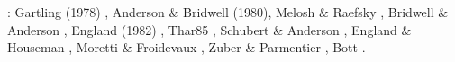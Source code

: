 \Literature: 
Gartling (1978) \cite{gart78}, 
Anderson \& Bridwell (1980)\cite{anbr80}, Melosh \& Raefsky \cite{mera80}, 
Bridwell \& Anderson \cite{bran80},
England (1982) \cite{engl82},
Thar85 \cite{thar85}, Schubert \& Anderson \cite{scan85},
England \& Houseman \cite{enho86}, Moretti \& Froidevaux \cite{mofr86},
Zuber \& Parmentier \cite{zupa86}, 
Bott \etal \cite{boww89}.




